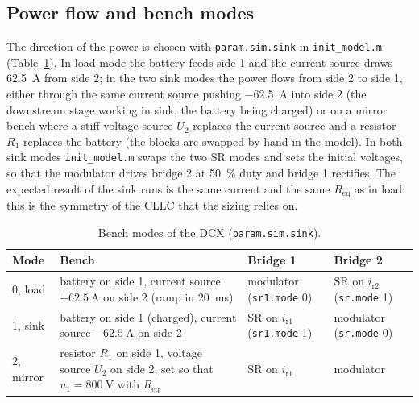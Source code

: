 \documentclass[12pt,a4paper]{scrartcl}
\newcommand{\ped}[1]{_{\mathrm{#1}}}
\newcommand{\code}[1]{\texttt{#1}}
\begin{document}
\begin{onehalfspace}
\subsection{Power flow and bench modes}
\label{sec:modes}

The direction of the power is chosen with \code{param.sim.sink} in \code{init\_model.m} (Table~\ref{tab:modes}). In load mode the battery feeds side 1 and the current source draws \SI{62.5}{\ampere} from side 2; in the two sink modes the power flows from side 2 to side 1, either through the same current source pushing \SI{-62.5}{\ampere} into side 2 (the downstream stage working in sink, the battery being charged) or on a mirror bench where a stiff voltage source $U\ped{2}$ replaces the current source and a resistor $R\ped{1}$ replaces the battery (the blocks are swapped by hand in the model). In both sink modes \code{init\_model.m} swaps the two SR modes and sets the initial voltages, so that the modulator drives bridge 2 at \SI{50}{\percent} duty and bridge 1 rectifies. The expected result of the sink runs is the same current and the same $R\ped{eq}$ as in load: this is the symmetry of the CLLC that the sizing relies on.

\begin{table}[H]
	\centering
	\captionsetup{width=0.9\textwidth, font=small}
	\caption[Bench modes of the DCX.]{Bench modes of the DCX (\code{param.sim.sink}).}
	\label{tab:modes}
	\small
	\begin{tabularx}{0.97\textwidth}{@{} l X >{\raggedright\arraybackslash}p{} >{\raggedright\arraybackslash}p{} @{}}
		\toprule
		\textbf{Mode} & \textbf{Bench} & \textbf{Bridge 1} & \textbf{Bridge 2} \\
		\midrule
		0, load & battery on side 1, current source $+\SI{62.5}{\ampere}$ on side 2 (ramp in \SI{20}{\milli\second}) & modulator (\code{sr1.mode} 0) & SR on $i\ped{r2}$ (\code{sr.mode} 1) \\
		1, sink & battery on side 1 (charged), current source $-\SI{62.5}{\ampere}$ on side 2 & SR on $i\ped{r1}$ (\code{sr1.mode} 1) & modulator (\code{sr.mode} 0) \\
		2, mirror & resistor $R\ped{1}$ on side 1, voltage source $U\ped{2}$ on side 2, set so that $u\ped{1} = \SI{800}{\volt}$ with $R\ped{eq}$ & SR on $i\ped{r1}$ & modulator \\
		\bottomrule
	\end{tabularx}
\end{table}


\end{onehalfspace}
\end{document}
